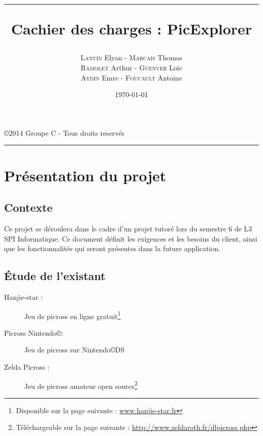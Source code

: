\documentclass[a4paper, 12pt, twoside]{article}
\title{\hrule \vspace{1cm} Cachier des charges : PicExplorer}
\author{\textsc{Lanvin} Elyan - \textsc{Marcais} Thomas\\ \textsc{Ramolet} Arthur - \textsc{Guenver} Loïc\\ \textsc{Aydin} Emre - \textsc{Foucault} Antoine}
\date{\today}
\begin{document}
\pagestyle{fancy}
\lhead{}
\chead{}
\rhead{\leftmark}
\cfoot{}

\clearpage
\thispagestyle{empty}

\maketitle
\begin{center}
 \copyright 2014 Groupe C - Tous droits reservés\\
\end{center}
\vspace{1cm}
\hrule
\thispagestyle{empty}

\newpage

\renewcommand{\contentsname}{Sommaire}
\tableofcontents
\newpage

\section{Présentation du projet}

\subsection{Contexte}

Ce projet se déroulera dans le cadre d'un projet tutoré lors du semestre 6 de L3 SPI Informatique. Ce document définit les exigences et les besoins du client, ainsi que les fonctionnalités qui seront présentes dans la future application.

\subsection{Étude de l'existant}

\begin{description}

  \item[Hanjie-star :] Jeu de picross en ligne gratuit\footnote{Disponible sur la page suivante : \url{www.hanjie-star.fr}}
  \item[Picross Nintendo\copyright :]  Jeu de picross sur Nintendo\copyright \space DS
  \item[Zelda Picross :] Jeu de picross amateur open source\footnote{Téléchargeable sur la page suivante : \url{http://www.zeldaroth.fr/dlpicross.php}}

\end{description}
\end{document}
